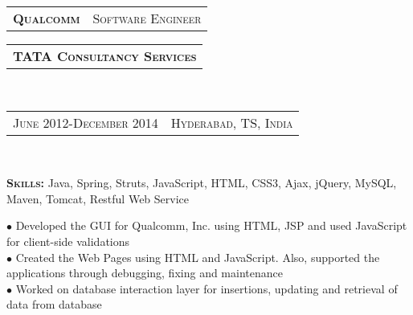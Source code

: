 \documentclass[10pt,a4paper,oneside]{article}
\begin{document}
\begin{minipage}[t]{0.4\textwidth}
        \begin{tabular}{c|c}
            \textbf{\normalsize Q\textsc{ualcomm}}
            &\textmd{\normalsize S\textsc{oftware} E\textsc{ngineer}}
        \end{tabular}
       \begin{tabular}{c}
            \textbf{\normalsize TATA C\textsc{onsultancy} S\textsc{ervices}}
        \end{tabular}\\
        \textcolor{light-gray}{
            \begin{tabular}{c|c}
                {\small J\textsc{une 2012}-D\textsc{ecember 2014}}
                &{\small H\textsc{yderabad}, T\textsc{S}, I\textsc{ndia}}
            \end{tabular}
        }\\
        \begin{adjustwidth}{7pt}{0pt}
            \textbf{S\textsc{kills: }} \small{Java, Spring, Struts, JavaScript, HTML, CSS3, Ajax, jQuery, MySQL, Maven, Tomcat, Restful Web Service}
        \end{adjustwidth}
        \vspace{1mm}
        \begin{adjustwidth}{7pt}{0pt}
            {\footnotesize $\bullet$ Developed the GUI for Qualcomm, Inc. using HTML, JSP and used JavaScript for client-side validations \\
            $\bullet$ Created the Web Pages using HTML and JavaScript. Also, supported the applications through debugging, fixing and maintenance \\
            $\bullet$ Worked on database interaction layer for insertions, updating and retrieval of data from database}\\
        \end{adjustwidth}        
        

\end{minipage}
\end{document}
